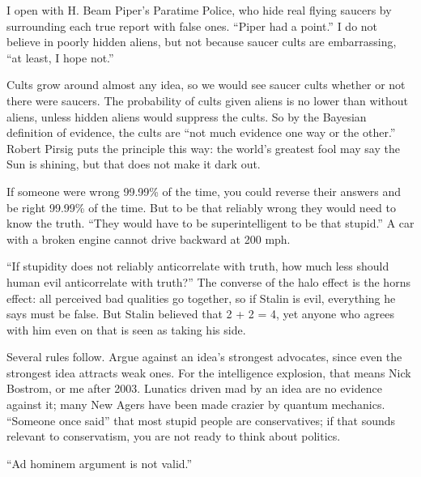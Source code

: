 
I open with H. Beam Piper's Paratime Police, who hide real flying saucers by surrounding each true report with false ones. ``Piper had a point.'' I do not believe in poorly hidden aliens, but not because saucer cults are embarrassing, ``at least, I hope not.''

Cults grow around almost any idea, so we would see saucer cults whether or not there were saucers. The probability of cults given aliens is no lower than without aliens, unless hidden aliens would suppress the cults. So by the Bayesian definition of evidence, the cults are ``not much evidence one way or the other.'' Robert Pirsig puts the principle this way: the world's greatest fool may say the Sun is shining, but that does not make it dark out. 

If someone were wrong 99.99\% of the time, you could reverse their answers and be right 99.99\% of the time. But to be that reliably wrong they would need to know the truth. ``They would have to be superintelligent to be that stupid.'' A car with a broken engine cannot drive backward at 200 mph.

``If stupidity does not reliably anticorrelate with truth, how much less should human evil anticorrelate with truth?''  The converse of the halo effect is the horns effect: all perceived bad qualities go together, so if Stalin is evil, everything he says must be false. But Stalin believed that 2 + 2 = 4, yet anyone who agrees with him even on that is seen as taking his side.

Several rules follow. Argue against an idea's strongest advocates, since even the strongest idea attracts weak ones. For the intelligence explosion, that means Nick Bostrom, or me after 2003.  Lunatics driven mad by an idea are no evidence against it; many New Agers have been made crazier by quantum mechanics. ``Someone once said'' that most stupid people are conservatives; if that sounds relevant to conservatism, you are not ready to think about politics. 

``Ad hominem argument is not valid.'' 

